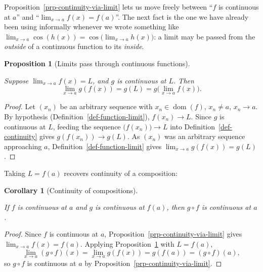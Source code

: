 \documentclass[
  letterpaper,
  DIV=11,
  numbers=noendperiod]{scrreprt}
\theoremstyle{plain}
\theoremstyle{plain}
\newtheorem{proposition}{Proposition}[chapter]
\theoremstyle{definition}
\theoremstyle{definition}
\theoremstyle{definition}
\theoremstyle{plain}
\theoremstyle{plain}
\newtheorem{corollary}{Corollary}[chapter]
\theoremstyle{remark}
\begin{document}
Proposition~\ref{prp-continuity-via-limit} lets us move freely between
``\(f\) is continuous at \(a\)'' and ``\(\lim_{x\to
a}f(x)=f(a)\)''. The next fact is the one we have already been using
informally whenever we wrote something like
\(\lim_{x\to a}\cos(h(x)) = \cos\!\big(\lim_{x\to a}h(x)\big)\): a limit
may be passed from the \emph{outside} of a continuous function to its
\emph{inside}.

\begin{proposition}[Limits pass through continuous
functions]\protect\hypertarget{prp-limit-inside-continuous}{}\label{prp-limit-inside-continuous}

Suppose \(\lim_{x\to a} f(x) = L\), and \(g\) is continuous at \(L\).
Then \[
\lim_{x\to a} g(f(x)) = g(L) = g\Big(\lim_{x\to a} f(x)\Big).
\]

\end{proposition}

\begin{proof}
Let \((x_n)\) be an arbitrary sequence with
\(x_n\in\operatorname{dom}(f)\), \(x_n\neq a\), \(x_n\to a\). By
hypothesis (Definition~\ref{def-function-limit}), \(f(x_n)\to L\). Since
\(g\) is continuous at \(L\), feeding the sequence
\(\big(f(x_n)\big)\to L\) into Definition~\ref{def-continuity} gives
\(g(f(x_n))\to g(L)\). As \((x_n)\) was an arbitrary sequence
approaching \(a\), Definition~\ref{def-function-limit} gives
\(\lim_{x\to a}g(f(x)) = g(L)\).
\end{proof}

Taking \(L=f(a)\) recovers continuity of a composition:

\begin{corollary}[Continuity of
compositions]\protect\hypertarget{cor-continuity-composition}{}\label{cor-continuity-composition}

If \(f\) is continuous at \(a\) and \(g\) is continuous at \(f(a)\),
then \(g\circ f\) is continuous at \(a\).

\end{corollary}

\begin{proof}
Since \(f\) is continuous at \(a\),
Proposition~\ref{prp-continuity-via-limit} gives
\(\lim_{x\to a}f(x) = f(a)\). Applying
Proposition~\ref{prp-limit-inside-continuous} with \(L=f(a)\), \[
\lim_{x\to a} (g\circ f)(x) = \lim_{x\to a} g(f(x)) = g(f(a)) = (g\circ f)(a),
\] so \(g\circ f\) is continuous at \(a\) by
Proposition~\ref{prp-continuity-via-limit}.
\end{proof}
\end{document}
